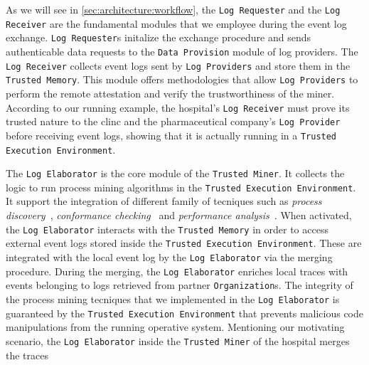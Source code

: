 As we will see in \cref{sec:architecture:workflow}, the \texttt{Log Requester} and the \texttt{Log Receiver} are the fundamental modules that we employee during the event log exchange. \texttt{Log Requester}s initalize the exchange procedure and sends authenticable data requests to the \texttt{Data Provision} module of log providers. The \texttt{Log Receiver} collects event logs sent by \texttt{Log Providers} and store them in the \texttt{Trusted Memory}. This module offers methodologies that allow \texttt{Log Providers} to perform the remote attestation and verify the trustworthiness of the miner. According to our running example, the hospital's \texttt{Log Receiver} must prove its trusted nature to the clinc and the pharmaceutical company's \texttt{Log Provider} before receiving event logs, showing that it is actually running in a \texttt{Trusted Execution Environment}.

The \texttt{Log Elaborator} is the core module of the \texttt{Trusted Miner}. It collects the logic to run process mining algorithms in the \texttt{Trusted Execution Environment}. It support the integration of different family of tecniques such as \textit{process discovery}~\cite{citation}, \textit{conformance checking}~\cite{citation} and \textit{performance analysis}~\cite{ciation}. When activated, the \texttt{Log Elaborator} interacts with the \texttt{Trusted Memory} in order to access external event logs stored inside the \texttt{Trusted Execution Environment}. These are integrated with the local event log by the \texttt{Log Elaborator} via the merging procedure. During the merging, the \texttt{Log Elaborator} enriches local traces with events belonging to logs retrieved from partner \texttt{Organization}s. The integrity of the process mining tecniques that we implemented in the \texttt{Log Elaborator} is guaranteed by the \texttt{Trusted Execution Environment} that prevents malicious code manipulations from the running operative system.
Mentioning our motivating scenario, the \texttt{Log Elaborator} inside the \texttt{Trusted Miner} of the hospital merges the traces 




































